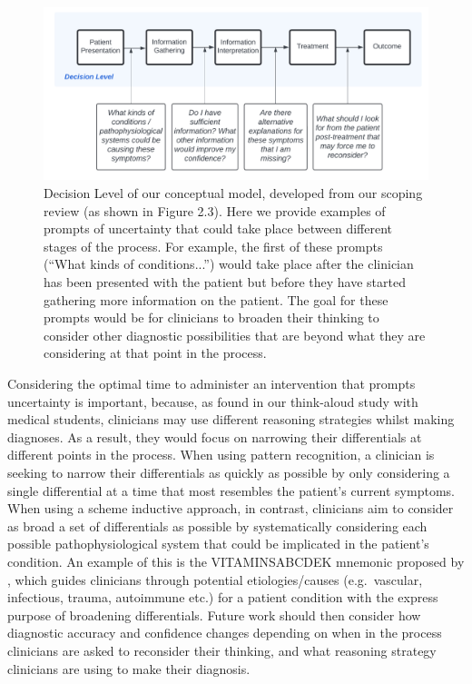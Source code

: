 \documentclass[a4paper, nobind]{templates/ociamthesis}
\begin{document}
\begin{figure}[H]

{\centering \includegraphics[width=1\linewidth]{./assets/UncertainPrompts} 

}

\caption[Overall Discussion: Conceptual Model for Prompting Uncertainty]{Decision Level of our conceptual model, developed from our scoping review (as shown in Figure 2.3). Here we provide examples of prompts of uncertainty that could take place between different stages of the process. For example, the first of these prompts (“What kinds of conditions...”) would take place after the clinician has been presented with the patient but before they have started gathering more information on the patient. The goal for these prompts would be for clinicians to broaden their thinking to consider other diagnostic possibilities that are beyond what they are considering at that point in the process.}\label{fig:uncertprompts}
\end{figure}

Considering the optimal time to administer an intervention that prompts uncertainty is important, because, as found in our think-aloud study with medical students, clinicians may use different reasoning strategies whilst making diagnoses. As a result, they would focus on narrowing their differentials at different points in the process. When using pattern recognition, a clinician is seeking to narrow their differentials as quickly as possible by only considering a single differential at a time that most resembles the patient's current symptoms. When using a scheme inductive approach, in contrast, clinicians aim to consider as broad a set of differentials as possible by systematically considering each possible pathophysiological system that could be implicated in the patient's condition. An example of this is the VITAMINSABCDEK mnemonic proposed by \textcite{zabidi-hussin2016}, which guides clinicians through potential etiologies/causes (e.g.~vascular, infectious, trauma, autoimmune etc.) for a patient condition with the express purpose of broadening differentials. Future work should then consider how diagnostic accuracy and confidence changes depending on when in the process clinicians are asked to reconsider their thinking, and what reasoning strategy clinicians are using to make their diagnosis.
\end{document}
